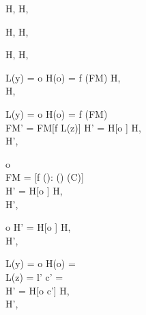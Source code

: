 \begin{figure}[h]
  {H,  \; \FRedTo \; H, }

  \RuleSpace{}

  {H,  \; \FRedTo \; H, }

  \RuleSpace{}

  {H,  \; \FRedTo \; H, }

  \RuleSpace{}

  {L(y) = o \andalso H(o) =  \andalso f \in \dom(FM)}
  {H,  \; \FRedTo  \\ 
  H, }

  \RuleSpace{}

  {L(y) = o \andalso H(o) =  \andalso f \in \dom(FM) \\
  FM' = FM[f \mapsto L(z)] \andalso H' = H[o \mapsto {}]}
  {H,  \; \FRedTo \\
   H', }

  \RuleSpace{}

  {o \\
  FM = [f \mapsto {}(\sigma): () \in \fdecls(C)] \\
  H' = H[o \mapsto {}]}
  {H,  \; \FRedTo \\
  H', }
  
  \RuleSpace{}

  {o \andalso
  H' = H[o \mapsto \Cell{\emptyset, \bot_{\LatVals{}}}]}
  {H,  \; \FRedTo \\
  H', }

  \RuleSpace{}
  
  {L(y) = o \andalso H(o) =  \\
  L(z) = l' \andalso c' =  \\
  H' = H[o \mapsto c']}
  {H,  \; \FRedTo \\
  H', }


\end{figure}

